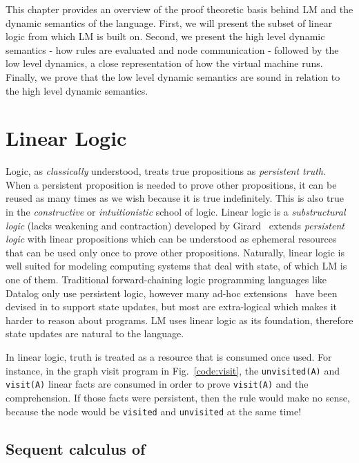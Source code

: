 This chapter provides an overview of the proof theoretic basis behind LM
and the dynamic semantics of the language. First, we will present the subset of
linear logic from which LM is built on. Second, we present the high level
dynamic semantics - how rules are evaluated and node communication - followed by
the low level dynamics, a close representation of how the virtual machine runs.
Finally, we prove that the low level dynamic semantics are sound in relation to
the high level dynamic semantics.

\section{Linear Logic}

Logic, as \emph{classically} understood, treats true propositions as
\emph{persistent truth}. When a persistent proposition is needed to prove other
propositions, it can be reused as many times as we wish because it is true
indefinitely. This is also true in the \emph{constructive} or
\emph{intuitionistic} school of logic.  Linear logic is a \emph{substructural
logic} (lacks weakening and contraction) developed by
Girard~\cite{Girard95logic:its} extends \emph{persistent logic} with linear
propositions which can be understood as ephemeral resources that can be used
only once to prove other propositions.  Naturally, linear logic is well
suited for modeling computing systems that deal with state, of which LM is
one of them.  Traditional forward-chaining logic programming languages like
Datalog only use persistent logic, however many ad-hoc
extensions~\cite{Liu98extendingdatalog,Ludascher95alogical} have been devised
in to support state updates, but most are extra-logical which makes it harder
to reason about programs. LM uses linear logic as its foundation, therefore
state updates are natural to the language.

In linear logic, truth is treated as a resource that is consumed once used. For
instance, in the graph visit program in Fig.~\ref{code:visit}, the
\texttt{unvisited(A)} and \texttt{visit(A)} linear facts are consumed in order
to prove \texttt{visit(A)} and the comprehension. If those facts were
persistent, then the rule would make no sense, because the node would be
\texttt{visited} and \texttt{unvisited} at the same time!

\subsection{Sequent calculus of \fragment}

